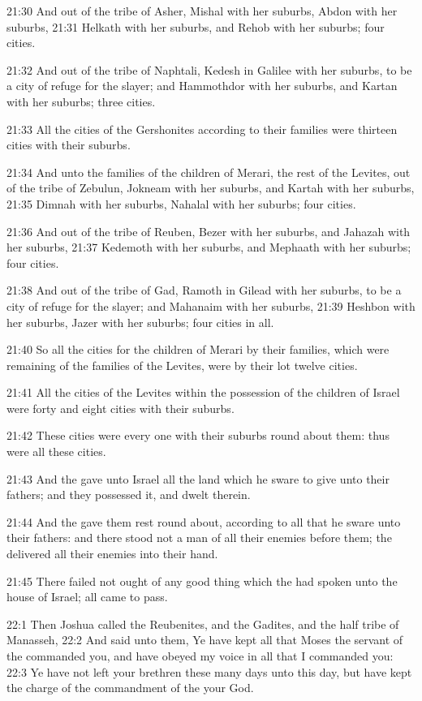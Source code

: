 21:30 And out of the tribe of Asher, Mishal with her suburbs, Abdon
with her suburbs, 21:31 Helkath with her suburbs, and Rehob with her
suburbs; four cities.

21:32 And out of the tribe of Naphtali, Kedesh in Galilee with her
suburbs, to be a city of refuge for the slayer; and Hammothdor with
her suburbs, and Kartan with her suburbs; three cities.

21:33 All the cities of the Gershonites according to their families
were thirteen cities with their suburbs.

21:34 And unto the families of the children of Merari, the rest of the
Levites, out of the tribe of Zebulun, Jokneam with her suburbs, and
Kartah with her suburbs, 21:35 Dimnah with her suburbs, Nahalal with
her suburbs; four cities.

21:36 And out of the tribe of Reuben, Bezer with her suburbs, and
Jahazah with her suburbs, 21:37 Kedemoth with her suburbs, and
Mephaath with her suburbs; four cities.

21:38 And out of the tribe of Gad, Ramoth in Gilead with her suburbs,
to be a city of refuge for the slayer; and Mahanaim with her suburbs,
21:39 Heshbon with her suburbs, Jazer with her suburbs; four cities in
all.

21:40 So all the cities for the children of Merari by their families,
which were remaining of the families of the Levites, were by their lot
twelve cities.

21:41 All the cities of the Levites within the possession of the
children of Israel were forty and eight cities with their suburbs.

21:42 These cities were every one with their suburbs round about them:
thus were all these cities.

21:43 And the \LORD gave unto Israel all the land which he sware to
give unto their fathers; and they possessed it, and dwelt therein.

21:44 And the \LORD gave them rest round about, according to all that
he sware unto their fathers: and there stood not a man of all their
enemies before them; the \LORD delivered all their enemies into their
hand.

21:45 There failed not ought of any good thing which the \LORD had
spoken unto the house of Israel; all came to pass.

22:1 Then Joshua called the Reubenites, and the Gadites, and the half
tribe of Manasseh, 22:2 And said unto them, Ye have kept all that
Moses the servant of the \LORD commanded you, and have obeyed my voice
in all that I commanded you: 22:3 Ye have not left your brethren these
many days unto this day, but have kept the charge of the commandment
of the \LORD your God.

